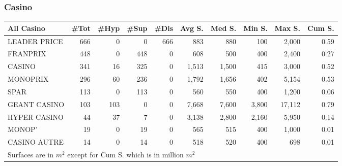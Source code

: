 \documentclass[11pt]{article}
\begin{document}
\subsubsection{Casino}

\begin{table}[H]
\footnotesize
\setlength{\tabcolsep}{2pt}

\begin{tabular}{lrrrrrrrrr}
\toprule
\toprule
All Casino &       \#Tot &       \#Hyp &       \#Sup &       \#Dis &     Avg S. &     Med S. &     Min S. &     Max S. &     Cum S. \\
\midrule
LEADER PRICE &        666 &          0 &          0 &        666 &        883 &        880 &        100 &      2,000 &       0.59 \\
FRANPRIX     &        448 &          0 &        448 &          0 &        608 &        500 &        400 &      2,400 &       0.27 \\
CASINO       &        341 &         16 &        325 &          0 &      1,513 &      1,500 &        415 &      3,000 &       0.52 \\
MONOPRIX     &        296 &         60 &        236 &          0 &      1,792 &      1,656 &        402 &      5,154 &       0.53 \\
SPAR         &        113 &          0 &        113 &          0 &        560 &        550 &        400 &      1,200 &       0.06 \\
GEANT CASINO &        103 &        103 &          0 &          0 &      7,668 &      7,600 &      3,800 &     17,112 &       0.79 \\
HYPER CASINO &         44 &         37 &          7 &          0 &      3,138 &      2,800 &      2,160 &      5,950 &       0.14 \\
MONOP'       &         19 &          0 &         19 &          0 &        565 &        515 &        400 &      1,000 &       0.01 \\
CASINO AUTRE &         14 &          0 &         14 &          0 &        518 &        520 &        400 &        698 &       0.01 \\
\bottomrule
\multicolumn{10}{l}{\footnotesize Surfaces are in $m^2$ except for Cum S. which is in million $m^2$} \\
\end{tabular}

\end{table}
\end{document}
